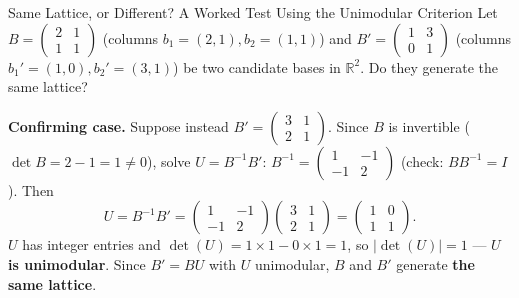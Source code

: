 \begin{exbox}{Same Lattice, or Different? A Worked Test Using the Unimodular Criterion}
Let $B = \begin{pmatrix} 2 & 1 \\ 1 & 1 \end{pmatrix}$ (columns $b_1=(2,1), b_2=(1,1)$) and $B' = \begin{pmatrix} 1 & 3 \\ 0 & 1 \end{pmatrix}$ (columns $b_1'=(1,0), b_2'=(3,1)$) be two candidate bases in $\mathbb{R}^2$. Do they generate the same lattice?

\textbf{Confirming case.} Suppose instead $B' = \begin{pmatrix} 3 & 1 \\ 2 & 1 \end{pmatrix}$. Since $B$ is invertible ($\det B = 2-1=1 \ne 0$), solve $U = B^{-1}B'$: $B^{-1} = \begin{pmatrix} 1 & -1 \\ -1 & 2\end{pmatrix}$ (check: $B B^{-1}=I$). Then
$$
U = B^{-1}B' = \begin{pmatrix} 1 & -1 \\ -1 & 2\end{pmatrix}\begin{pmatrix} 3 & 1 \\ 2 & 1\end{pmatrix} = \begin{pmatrix} 1 & 0 \\ 1 & 1 \end{pmatrix}.
$$
$U$ has integer entries and $\det(U) = 1\times1 - 0\times1 = 1$, so $|\det(U)|=1$ --- $U$ \textbf{is unimodular}. Since $B' = BU$ with $U$ unimodular, $B$ and $B'$ generate \textbf{the same lattice}.


\end{exbox}
